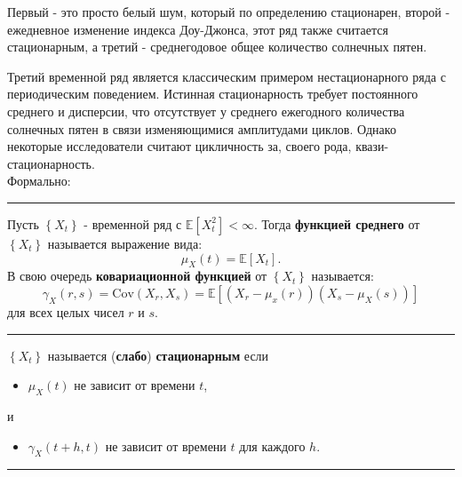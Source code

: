 Первый - это просто белый шум, который по определению стационарен, второй - ежедневное изменение индекса Доу-Джонса, 
этот ряд также считается стационарным, а третий - среднегодовое общее количество солнечных пятен. 

Третий временной ряд является классическим примером нестационарного ряда с периодическим поведением. 
Истинная стационарность требует постоянного среднего и дисперсии, что отсутствует у среднего 
ежегодного количества солнечных пятен в связи изменяющимися амплитудами циклов. Однако некоторые 
исследователи считают цикличность за, своего рода, \guillemotleft квази-стационарность\guillemotright \cite{Forecasting_Brockwell}.\\

Формально:

\noindent\rule{\linewidth}{0.1mm}

\begin{definition}
    Пусть $\left\{ X_t \right\}$ - временной ряд с 
    $\mathbb{E}\left[ X_t^2 \right] < \infty$. Тогда \textbf{функцией среднего} 
    от $\left\{ X_t \right\}$ называется выражение вида:
    \vspace{-10pt}
    \begin{equation*}
        \mu_X(t) = \mathbb{E} \left[ X_t \right].
    \end{equation*}
    \vspace{-20pt}
    В свою очередь \textbf{ковариационной функцией} от $\left\{ X_t \right\}$ называется:
    \begin{equation*}
        \gamma_X (r, s) = \text{Cov}(X_r, X_s) = \mathbb{E}\left[ (X_r - \mu_x (r)) 
        (X_s - \mu_X (s)) \right]
    \end{equation*}
    \vspace{-20pt}
    для всех целых чисел $r$ и $s$.\\
\end{definition}

\noindent\rule{\linewidth}{0.1mm}

\begin{definition}
    $\left\{ X_t \right\}$ называется (\textbf{слабо}) 
    \textbf{стационарным} если
    \begin{itemize}
        \item $\mu_X(t)$ не зависит от времени $t$,
    \end{itemize}
    \vspace{-10pt}
    и 
    \vspace{-10pt}
    \begin{itemize}
        \item $\gamma_X(t+h, t)$ не зависит от времени $t$ для каждого $h$.
    \end{itemize}
    \noindent\rule{\linewidth}{0.1mm}
\end{definition}

